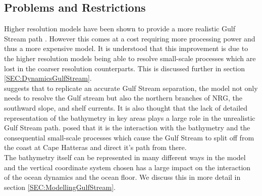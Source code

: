 \documentclass[..\EOYR.tex]{subfiles}
\begin{document}

\subsection{Problems and Restrictions}
\label{SSEC:ProblemsRestrictions}

Higher resolution models have been shown to provide a more realistic Gulf Stream path \citep{Scaife2011a}.
However this comes at a cost requiring more processing power and thus a more expensive model. 
It is understood \citep{Nikurashin2012a} 
that this improvement is due to the higher resolution models being able to resolve small-scale processes which are lost in the coarser resolution counterparts. This is discussed further in section \ref{SEC:DynamicsGulfStream}.\\
\citep{Ezer2016b} suggests that to replicate an accurate Gulf Stream separation, the model not only needs to resolve the Gulf stream but also the northern branches of NRG, the southward slope, and shelf currents.
It is also thought
that the lack of detailed representation of the bathymetry in key areas plays a large role in the unrealistic Gulf Stream path.
\citep{Ezer2016b} posed that it is the interaction with the bathymetry and the consequential small-scale processes which cause the Gulf Stream to split off from the coast at Cape Hatteras and direct it's path from there.\\
The bathymetry itself can be represented in many different ways in the model and the vertical coordinate system chosen has a large impact on the interaction of the ocean dynamics and the ocean floor. We discuss this in more detail in section \ref{SEC:ModellingGulfStream}.
\end{document}
